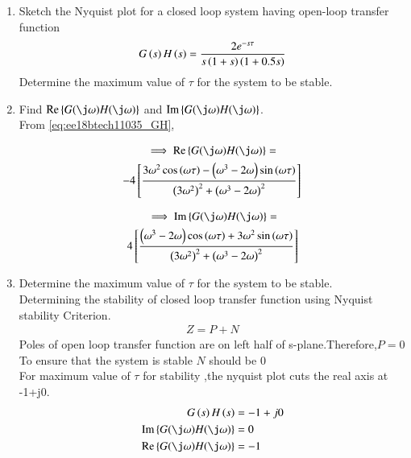 \begin{enumerate}[label=\thesubsection.\arabic*.,ref=\thesubsection.\theenumi]

\item Sketch the Nyquist plot for a closed loop system having open-loop transfer function 
\begin{align}
\label{eq:ee18btech11035_GH}
    G\left(s\right)H\left(s\right)=\frac{2e^{-s\tau}}{s\left(1+s\right)\left(1+0.5s\right)}
\end{align}
Determine the maximum value of $\tau$ for the system to be stable.

\item Find $\text{Re} \cbrak{G(\j\omega)H(\j\omega)}$ and $\text{Im} \cbrak{G(\j\omega)H(\j\omega)}$.\\
\solution From \eqref{eq:ee18btech11035_GH},

\begin{multline}
\label{eq:ee18btech11035_Re}
\implies  \text{Re} \cbrak{G(\j\omega)H(\j\omega)} =
\\
-4\sbrak{\frac{3\omega^2\cos\brak{\omega\tau}-\brak{\omega^3-2\omega}\sin\brak{\omega\tau}}{  \brak{3\omega^2}^2+ \brak{\omega^3-2\omega}^2  }}
\end{multline}

\begin{multline}
\label{eq:ee18btech11035_Im}
\implies  \text{Im} \cbrak{G(\j\omega)H(\j\omega)} =
\\
4\sbrak{\frac{\brak{\omega^3-2\omega}\cos\brak{\omega\tau}+3\omega^2\sin\brak{\omega\tau}}{  \brak{3\omega^2}^2+ \brak{\omega^3-2\omega}^2  }}
\end{multline}

\item Determine the maximum value of $\tau$ for the system to be stable.\\
\solution Determining the stability of closed loop transfer function using Nyquist stability Criterion.\\
\begin{align}
    Z=P+N
\end{align}
Poles of open loop transfer function are on left half of s-plane.Therefore,$P=0$\\
To ensure that the system is stable $N$ should be 0\\
For maximum value of $\tau$ for stability ,the nyquist plot cuts the real axis at -1+j0.\\
\begin{align}
    G\brak{s}H\brak{s} &= -1+j0\\
    \label{eq:ee18btech11035_im0}
    \text{Im} \cbrak{G(\j\omega)H(\j\omega)} &= 0\\
    \label{eq:ee18btech11035_Re0}
    \text{Re} \cbrak{G(\j\omega)H(\j\omega)} &= -1
\end{align}


\end{enumerate}
